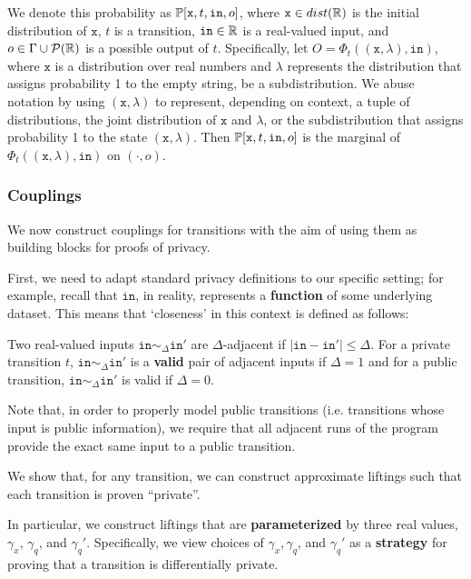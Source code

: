 We denote this probability as $\mathbb{P}[\texttt{x}, t, \texttt{in}, o]$, where $\texttt{x} \in dist(\mathbb{R})$ is the initial distribution of $\texttt{x}$, $t$ is a transition, $\texttt{in}\in \mathbb{R}$ is a real-valued input, and $o\in \Gamma\cup \mathcal{P}(\mathbb{R})$ is a possible output of $t$. 
Specifically, let $O = \Phi_t((\texttt{x}, \lambda), \texttt{in})$, where $\texttt{x}$ is a distribution over real numbers and $\lambda$ represents the distribution that assigns probability 1 to the empty string, be a subdistribution.
 We abuse notation by using $(\texttt{x}, \lambda)$ to represent, depending on context, a tuple of distributions, the joint distribution of $\texttt{x}$ and $\lambda$, or the subdistribution that assigns probability 1 to the state $(\texttt{x}, \lambda)$. Then $\mathbb{P}[\texttt{x}, t, \texttt{in}, o]$ is the marginal of $\Phi_t((\texttt{x}, \lambda), \texttt{in})$ on $(\cdot, o)$. 

\subsubsection{Couplings}

We now construct couplings for transitions with the aim of using them as building blocks for proofs of privacy.

First, we need to adapt standard privacy definitions to our specific setting; for example, recall that $\texttt{in}$, in reality, represents a \textbf{function} of some underlying dataset. This means that `closeness' in this context is defined as follows:

\begin{defn}
    Two real-valued inputs $\texttt{in}\sim_{\Delta} \texttt{in}'$ are $\Delta$-adjacent if $|\texttt{in}-\texttt{in}'|\leq \Delta$. For a private transition $t$, $\texttt{in}\sim_{\Delta}\texttt{in}'$ is a \textbf{valid} pair of adjacent inputs if $\Delta = 1$ and for a public transition, $\texttt{in}\sim_{\Delta}\texttt{in}'$ is valid if $\Delta = 0$.
\end{defn}

Note that, in order to properly model public transitions (i.e. transitions whose input is public information), we require that all adjacent runs of the program provide the exact same input to a public transition. 

We show that, for any transition, we can construct approximate liftings such that each transition is proven ``private''. 

In particular, we construct liftings that are \textbf{parameterized} by three real values, $\gamma_x$, $\gamma_q$, and $\gamma_q'$. Specifically, we view choices of $\gamma_x, \gamma_q$, and $\gamma_q'$ as a \textbf{strategy} for proving that a transition is differentially private.

